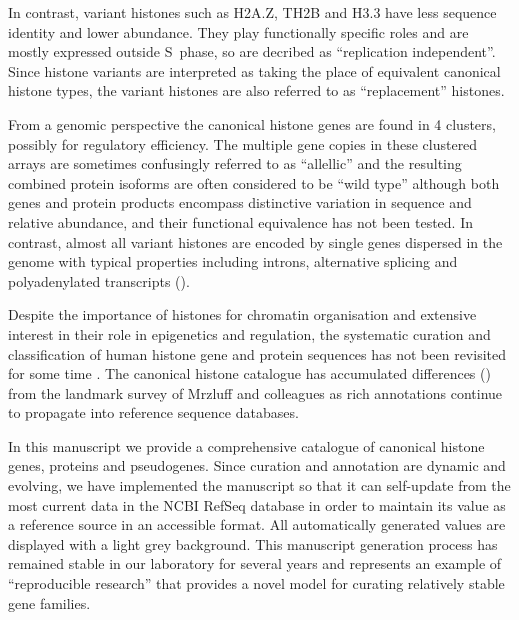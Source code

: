 	In contrast, variant histones such as H2A.Z, TH2B and H3.3 have 
	less sequence identity and lower abundance. 
	They play functionally specific roles and are mostly expressed outside S~phase, 
	so are decribed as ``replication independent''. 
	Since histone variants are interpreted as taking the place of equivalent canonical histone types, 
	the variant histones are also referred to as ``replacement'' histones.

	From a genomic perspective the canonical histone genes are found in 4 clusters, 
	possibly for regulatory efficiency. 
	The multiple gene copies in these clustered arrays are sometimes confusingly referred to as ``allellic'' 
	and the resulting combined protein isoforms are often considered to be ``wild type'' 
	although both genes and protein products encompass distinctive variation in sequence and relative abundance, 
	and their functional equivalence has not been tested.
	In contrast, almost all variant histones are encoded by single genes dispersed in the genome 
	with typical properties including introns, alternative splicing 
	and polyadenylated transcripts ().

	Despite the importance of histones for chromatin organisation and extensive interest
	in their role in epigenetics and regulation, the systematic curation and classification of human histone
	gene and protein sequences has not been revisited for some time \citep{Marzluff02}. 
	The canonical histone catalogue has accumulated 
	 differences ()
	from the landmark survey of Mrzluff and colleagues \citep{Marzluff02} 
	as rich annotations continue to propagate into reference sequence databases.

	In this manuscript we provide a comprehensive catalogue
	of canonical histone genes, proteins and pseudogenes.
	Since curation and annotation are dynamic and evolving,
	we have implemented the manuscript so that it can 
	self-update from the most current data in the NCBI RefSeq database 
	in order to maintain its value as a reference source in an accessible format.
	All automatically generated values are displayed with a light grey background.
	This manuscript generation process has remained stable in our laboratory for several years
	and represents an example of ``reproducible research'' \citep{Claerbout2000}
	that provides a novel model for curating relatively stable gene families.

